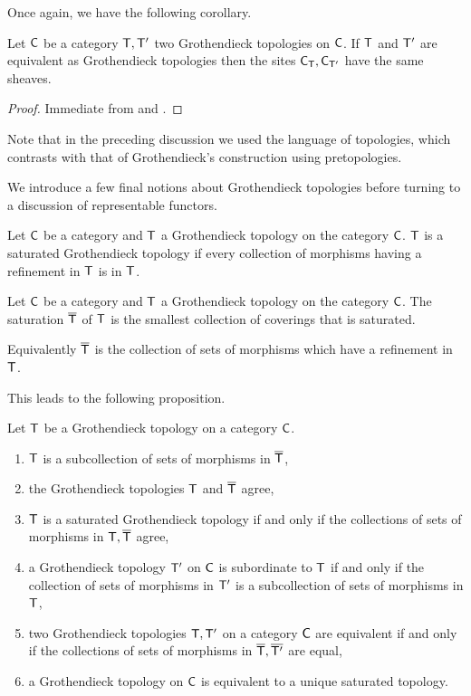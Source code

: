 Once again, we have the following corollary. 
\begin{corollary}\label{corr: refinements and sheaves on sites}
    Let $\mathsf{C}$ be a category $\mathsf{T},\mathsf{T}'$ two Grothendieck topologies on $\mathsf{C}$. If $\mathsf{T}$ and $\mathsf{T}'$ are equivalent as Grothendieck topologies then the sites $\mathsf{C}_{\mathsf{T}},\mathsf{C}_{\mathsf{T}'}$ have the same sheaves.
\end{corollary}
\begin{proof}
    Immediate from  and .
\end{proof}
\begin{remark}
    Note that in the preceding discussion we used the language of topologies, which contrasts with that of Grothendieck's construction using pretopologies. 
\end{remark}
We introduce a few final notions about Grothendieck topologies before turning to a discussion of representable functors. 
\begin{definition}\label{def: sturated topology}
    Let $\mathsf{C}$ be a category and $\mathsf{T}$ a Grothendieck topology on the category $\mathsf{C}$. $\mathsf{T}$ is a saturated Grothendieck topology if every collection of morphisms having a refinement in $\mathsf{T}$ is in $\mathsf{T}$. 
\end{definition}
\begin{definition}[Saturation]\label{def: saturation}
    Let $\mathsf{C}$ be a category and $\mathsf{T}$ a Grothendieck topology on the category $\mathsf{C}$. The saturation $\overline{\mathsf{T}}$ of $\mathsf{T}$ is the smallest collection of coverings that is saturated. 
\end{definition}
\begin{remark}
    Equivalently $\overline{\mathsf{T}}$ is the collection of sets of morphisms which have a refinement in $\mathsf{T}$. 
\end{remark}
This leads to the following proposition. \newpage
\begin{proposition}\label{prop: saturated GTs}
    Let $\mathsf{T}$ be a Grothendieck topology on a category $\mathsf{C}$. 
    \begin{enumerate}[label=(\alph*)]
        \item $\mathsf{T}$ is a subcollection of sets of morphisms in $\overline{\mathsf{T}}$, 
        \item the Grothendieck topologies $\mathsf{T}$ and $\overline{\mathsf{T}}$ agree,
        \item $\mathsf{T}$ is a saturated Grothendieck topology if and only if the collections of sets of morphisms in $\mathsf{T},\overline{\mathsf{T}}$ agree,
        \item a Grothendieck topology $\mathsf{T}'$ on $\mathsf{C}$ is subordinate to $\mathsf{T}$ if and only if the collection of sets of morphisms in $\mathsf{T}'$ is a subcollection of sets of morphisms in $\mathsf{T}$, 
        \item two Grothendieck topologies $\mathsf{T},\mathsf{T}'$ on a category $\mathsf{C}$ are equivalent if and only if the collections of sets of morphisms in $\overline{\mathsf{T}},\overline{\mathsf{T}'}$ are equal,
        \item a Grothendieck topology on $\mathsf{C}$ is equivalent to a unique saturated topology. 
    \end{enumerate}
\end{proposition}
